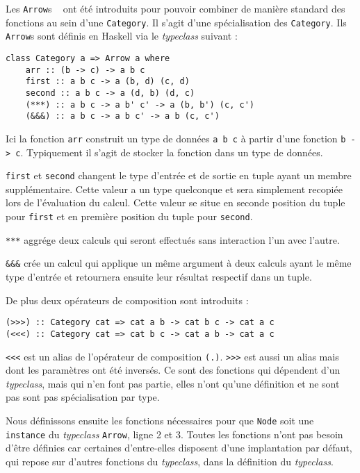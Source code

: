 \documentclass{llncs}
\newcommand{\Arrs}{\lstinline{Arrow}s }
\newcommand{\Arrv}{\lstinline{Arrow}, }
\begin{document}
Les \Arrs~\cite{Hughes00} ont été introduits pour pouvoir combiner de manière
standard des fonctions au sein d'une \lstinline{Category}.
Il s'agit d'une spécialisation des \lstinline{Category}.
Ils \Arrs sont définis en Haskell via le \emph{typeclass} suivant :
\begin{lstlisting}
class Category a => Arrow a where
    arr :: (b -> c) -> a b c
    first :: a b c -> a (b, d) (c, d)
    second :: a b c -> a (d, b) (d, c)
    (***) :: a b c -> a b' c' -> a (b, b') (c, c')
    (&&&) :: a b c -> a b c' -> a b (c, c')
\end{lstlisting}

Ici la fonction \lstinline{arr} construit un type de données
\lstinline{a b c} à partir d'une fonction \lstinline{b -> c}.
Typiquement il s'agit de stocker la fonction dans un type de données.

\lstinline{first} et \lstinline{second} changent le type d'entrée et de sortie
en tuple ayant un membre supplémentaire.
Cette valeur a un type quelconque et sera simplement recopiée lors de l'évaluation
du calcul.
Cette valeur se situe en seconde position du tuple pour \lstinline{first} et en
première position du tuple pour \lstinline{second}.

\lstinline{***} aggrége deux calculs qui seront effectués sans interaction l'un
avec l'autre.

\lstinline{&&&} crée un calcul qui applique un même argument à deux calculs ayant
le même type d'entrée et retournera ensuite leur résultat respectif dans un tuple.

De plus deux opérateurs de composition sont introduits :
\begin{lstlisting}
(>>>) :: Category cat => cat a b -> cat b c -> cat a c
(<<<) :: Category cat => cat b c -> cat a b -> cat a c
\end{lstlisting}

\lstinline{<<<} est un alias de l'opérateur de composition \lstinline{(.)}.
\lstinline{>>>} est aussi un alias mais dont les paramètres ont été inversés.
Ce sont des fonctions qui dépendent d'un \emph{typeclass}, mais qui n'en font pas
partie, elles n'ont qu'une définition et ne sont pas sont pas spécialisation par
type.

Nous définissons ensuite les fonctions nécessaires pour que \lstinline{Node} soit
une \lstinline{instance} du \emph{typeclass} \Arrv ligne 2 et 3.
Toutes les fonctions n'ont pas besoin d'être définies car certaines d'entre-elles
disposent d'une implantation par défaut, qui repose sur d'autres fonctions du
\emph{typeclass}, dans la définition du \emph{typeclass}.
\end{document}
